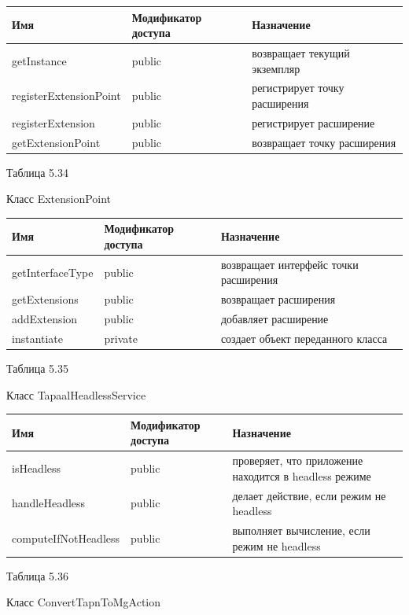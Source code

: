 \documentclass{../TechDoc}
\begin{document}
	\begin{tabular}{|p{5cm}|p{5cm}|p{5cm}|}
		\hline
		\textbf{Имя} & \textbf{Модификатор доступа} & \textbf{Назначение} \\
		\hline
		getInstance& public& возвращает текущий экземпляр\\
		\hline
		registerExtensionPoint& public& регистрирует точку расширения\\
		\hline
		registerExtension&public & регистрирует расширение\\
		\hline
		getExtensionPoint&public & возвращает точку расширения\\
		
		\hline
	\end{tabular}
	\begin{flushright}
		Таблица 5.34
	\end{flushright}
	Класс ExtensionPoint
	
	\begin{tabular}{|p{5cm}|p{5cm}|p{5cm}|}
		\hline
		\textbf{Имя} & \textbf{Модификатор доступа} & \textbf{Назначение} \\
		\hline
		getInterfaceType& public& возвращает интерфейс точки расширения\\
		\hline
		getExtensions& public& возвращает расширения\\
		\hline
		addExtension& public& добавляет расширение\\
		\hline
		instantiate& private& создает объект переданного класса\\
		
		\hline
	\end{tabular}
	\begin{flushright}
		Таблица 5.35
	\end{flushright}
	Класс TapaalHeadlessService
	
	\begin{tabular}{|p{5cm}|p{5cm}|p{5cm}|}
		\hline
		\textbf{Имя} & \textbf{Модификатор доступа} & \textbf{Назначение} \\
		\hline
		isHeadless& public& проверяет, что приложение находится в headless режиме \\
		\hline
		handleHeadless& public& делает действие, если режим не headless\\
		\hline
		computeIfNotHeadless&public & выполняет вычисление, если режим не headless\\
		
		\hline
	\end{tabular}
	
	\begin{flushright}
		Таблица 5.36
	\end{flushright}
	Класс ConvertTapnToMgAction
	
\end{document}
